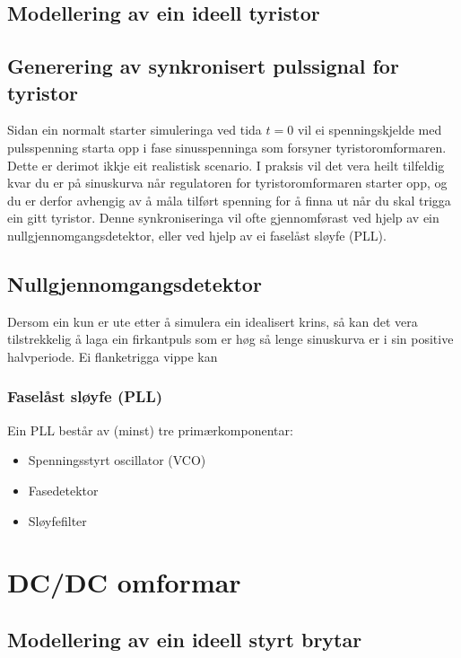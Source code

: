 \documentclass[10pt,a4paper]{article}
\begin{document}
	
	\subsection{Modellering av ein ideell tyristor}
	
	\subsection{Generering av synkronisert pulssignal for tyristor}
	
	Sidan ein normalt starter simuleringa ved tida \(t = 0\) vil ei spenningskjelde med pulsspenning starta opp i fase sinusspenninga som forsyner tyristoromformaren. Dette er derimot ikkje eit realistisk scenario. I praksis vil det vera heilt tilfeldig kvar du er på sinuskurva når regulatoren for tyristoromformaren starter opp, og du er derfor avhengig av å måla tilført spenning for å finna ut når du skal trigga ein gitt tyristor. Denne synkroniseringa vil ofte gjennomførast ved hjelp av ein nullgjennomgangsdetektor, eller ved hjelp av ei faselåst sløyfe (PLL).
	
	\subsection{Nullgjennomgangsdetektor}
	
	Dersom ein kun er ute etter å simulera ein idealisert krins, så kan det vera tilstrekkelig å laga ein firkantpuls som er høg så lenge sinuskurva er i sin positive halvperiode. Ei flanketrigga vippe kan 
	
	\subsubsection{Faselåst sløyfe (PLL)}
	
	Ein PLL består av (minst) tre primærkomponentar:
	
	\begin{itemize}
		\item Spenningsstyrt oscillator (VCO)
		\item Fasedetektor
		\item Sløyfefilter
	\end{itemize}
	
	
	
	\section{DC/DC omformar}
	
	
	\subsection{Modellering av ein ideell styrt brytar}
	
\end{document}
